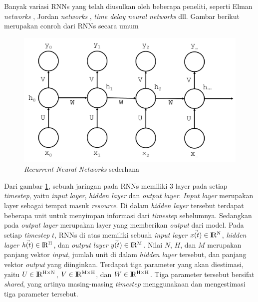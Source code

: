 Banyak variasi RNNs yang telah diusulkan oleh beberapa peneliti, seperti Elman \textit{networks} \citep{elman1990finding}, Jordan \textit{networks} \citep{jordan1986attractor}, \textit{time delay neural networks} \citep{lang1990time} dll. Gambar berikut merupakan conroh  dari RNNs secara umum

\begin{figure}
	\centering
	\includegraphics[width=0.80\linewidth]{images/simple_rnn}
	\caption{\textit{Recurrent Neural Networks} sederhana}
	\label{fig:simple_rnn}
\end{figure}

Dari gambar \ref{fig:simple_rnn}, sebuah jaringan pada RNNs memiliki 3 layer pada setiap \textit{timestep}, yaitu \textit{input layer}, \textit{hidden layer} dan \textit{output layer}. \textit{Input layer} merupakan layer sebagai tempat masuk \textit{resource}. Di dalam \textit{hidden layer} tersebut terdapat beberapa unit untuk menyimpan informasi dari \textit{timestep} sebelumnya. Sedangkan pada \textit{output layer} merupakan layer yang memberikan \textit{output} dari model. Pada setiap \textit{timestep} $ t $, RNNs di atas memiliki sebuah \textit{input layer} $ \vec{x(t)} \in {\rm I\!R^{N}} $, \textit{hidden layer} $ \vec{h(t)} \in {\rm I\!R^{H}} $, dan \textit{output layer} $ \vec{y(t)} \in {\rm I\!R^{M}} $. Nilai $ N $, $ H $, dan $ M $ merupakan panjang vektor \textit{input}, jumlah unit di dalam \textit{hidden layer} tersebut, dan panjang vektor \textit{output} yang diinginkan. Terdapat tiga parameter yang akan diestimasi, yaitu $ U \in {\rm I\!R^{H \times N }} $, $ V \in {\rm I\!R^{M \times H}}$, dan $ W \in {\rm I\!R^{H \times H}}$. Tiga parameter tersebut bersifat \textit{shared}, yang artinya masing-masing \textit{timestep} menggunakaan dan mengestimasi tiga parameter tersebut.

